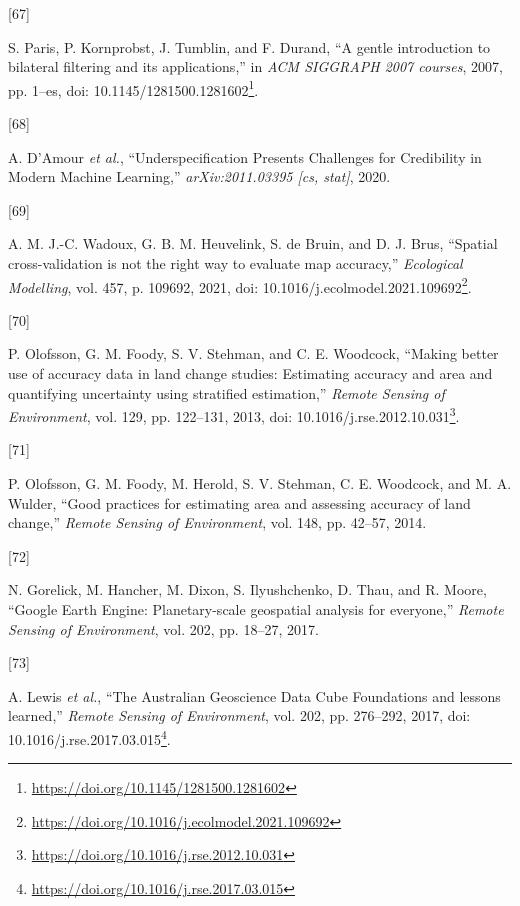 \documentclass[
  11pt,
]{report}
\newlength{\cslhangindent}
\newlength{\csllabelwidth}
\newlength{\cslentryspacingunit} %
\newenvironment{CSLReferences}[2] %
 {%
  \setlength{\parindent}{0pt}
  \ifodd #1
  \let\oldpar\par
  \def\par{\hangindent=\cslhangindent\oldpar}
  \fi
  \setlength{\parskip}{#2\cslentryspacingunit}
 }%
 {}
\newcommand{\CSLLeftMargin}[1]{\parbox[t]{\csllabelwidth}{#1}}
\newcommand{\CSLRightInline}[1]{\parbox[t]{\linewidth - \csllabelwidth}{#1}\break}
\renewcommand{\href}[2]{#2\footnote{\url{#1}}}
\begin{document}
\begin{CSLReferences}{0}{0}
\leavevmode{}%
\CSLLeftMargin{{[}67{]} }%
\CSLRightInline{S. Paris, P. Kornprobst, J. Tumblin, and F. Durand, {``A
gentle introduction to bilateral filtering and its applications,''} in
\emph{{ACM SIGGRAPH} 2007 courses}, 2007, pp. 1--es, doi:
\href{https://doi.org/10.1145/1281500.1281602}{10.1145/1281500.1281602}.}

\leavevmode{}%
\CSLLeftMargin{{[}68{]} }%
\CSLRightInline{A. D'Amour \emph{et al.}, {``Underspecification
{Presents Challenges} for {Credibility} in {Modern Machine Learning},''}
\emph{arXiv:2011.03395 {[}cs, stat{]}}, 2020.}

\leavevmode{}%
\CSLLeftMargin{{[}69{]} }%
\CSLRightInline{A. M. J.-C. Wadoux, G. B. M. Heuvelink, S. de Bruin, and
D. J. Brus, {``Spatial cross-validation is not the right way to evaluate
map accuracy,''} \emph{Ecological Modelling}, vol. 457, p. 109692, 2021,
doi:
\href{https://doi.org/10.1016/j.ecolmodel.2021.109692}{10.1016/j.ecolmodel.2021.109692}.}

\leavevmode{}%
\CSLLeftMargin{{[}70{]} }%
\CSLRightInline{P. Olofsson, G. M. Foody, S. V. Stehman, and C. E.
Woodcock, {``Making better use of accuracy data in land change studies:
{Estimating} accuracy and area and quantifying uncertainty using
stratified estimation,''} \emph{Remote Sensing of Environment}, vol.
129, pp. 122--131, 2013, doi:
\href{https://doi.org/10.1016/j.rse.2012.10.031}{10.1016/j.rse.2012.10.031}.}

\leavevmode{}%
\CSLLeftMargin{{[}71{]} }%
\CSLRightInline{P. Olofsson, G. M. Foody, M. Herold, S. V. Stehman, C.
E. Woodcock, and M. A. Wulder, {``Good practices for estimating area and
assessing accuracy of land change,''} \emph{Remote Sensing of
Environment}, vol. 148, pp. 42--57, 2014.}

\leavevmode{}%
\CSLLeftMargin{{[}72{]} }%
\CSLRightInline{N. Gorelick, M. Hancher, M. Dixon, S. Ilyushchenko, D.
Thau, and R. Moore, {``Google {Earth Engine}: {Planetary-scale}
geospatial analysis for everyone,''} \emph{Remote Sensing of
Environment}, vol. 202, pp. 18--27, 2017.}

\leavevmode{}%
\CSLLeftMargin{{[}73{]} }%
\CSLRightInline{A. Lewis \emph{et al.}, {``The {Australian Geoscience
Data Cube} \textemdash{} {Foundations} and lessons learned,''}
\emph{Remote Sensing of Environment}, vol. 202, pp. 276--292, 2017, doi:
\href{https://doi.org/10.1016/j.rse.2017.03.015}{10.1016/j.rse.2017.03.015}.}


\end{CSLReferences}
\end{document}
